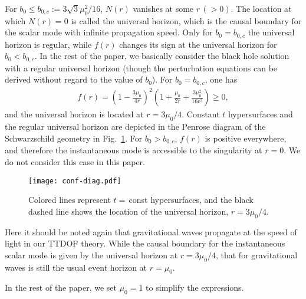 \documentclass[aps,prd,preprintnumbers,superscriptaddress,nofootinbib,notitlepage]{revtex4-2}
\begin{document}
For $b_0\le b_{0,c}:=3\sqrt{3}\mu_0^2/16$, $N(r)$ vanishes at some $r\,(>0)$.
The location at which $N(r)=0$ is called the universal horizon,
which is the causal boundary for the scalar mode with infinite propagation speed.
Only for $b_0=b_{0,c}$ the universal horizon is regular,
while $f(r)$ changes its sign at the universal horizon for $b_0<b_{0,c}$.
In the rest of the paper, we basically consider the black hole solution with
a regular universal horizon (though the perturbation equations can be derived
without regard to the value of $b_0$).
For $b_0=b_{0,c}$, one has
\begin{align}
    f(r)=\left(1-\frac{3\mu_0}{4r}\right)^2\left(1+\frac{\mu_0}{2r}+\frac{3\mu_0^2}{16r^2}\right)\ge 0,
\end{align}
and the universal horizon is located at $r=3\mu_0/4$.
Constant $t$ hypersurfaces and the regular universal horizon are depicted in the Penrose diagram of the Schwarzschild geometry in Fig.~\ref{fig:conf-diag.pdf}.
For $b_0>b_{0,c}$, $f(r)$ is positive everywhere, and therefore the instantaneous mode
is accessible to the singularity at $r=0$. We do not consider this case in this paper.



        \begin{figure}[tb]
                \begin{center}
                        \texttt{[image: conf-diag.pdf]}
                \end{center}
                        \caption{Colored lines represent $t=\,$const hypersurfaces,
                        and the black dashed line shows the location of the universal horizon,
                        $r=3\mu_0/4$.}
                \label{fig:conf-diag.pdf}
        \end{figure}



Here it should be noted again that gravitational waves propagate at the speed of light in our TTDOF theory.
While the causal boundary for the instantaneous scalar mode is given by the universal horizon at $r=3\mu_0/4$, that for gravitational waves is still the usual event horizon at $r=\mu_0$.


In the rest of the paper, we set $\mu_0=1$ to simplify the expressions.
\end{document}
